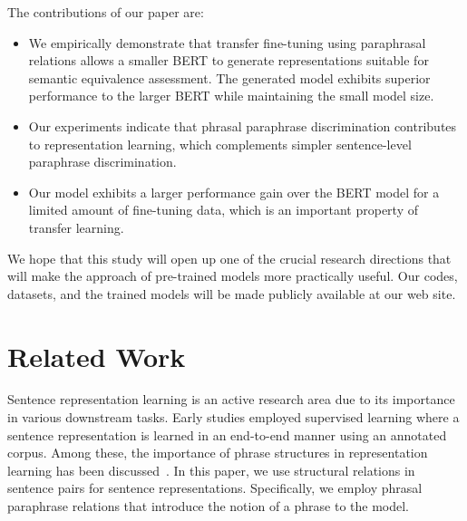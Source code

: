 \documentclass[11pt,a4paper]{article}
\begin{document}
 
The contributions of our paper are:
{
\setlength{\leftmargini}{15pt}
\begin{itemize}
\setlength{\itemsep}{0pt}
\item We empirically demonstrate that transfer fine-tuning using paraphrasal relations allows a smaller BERT to generate representations suitable for semantic equivalence assessment. The generated model exhibits superior performance to the larger BERT while maintaining the small model size. 
\item Our experiments indicate that phrasal paraphrase discrimination contributes to representation learning, which complements simpler sentence-level paraphrase discrimination. 
\item Our model exhibits a larger performance gain over the BERT model for a limited amount of fine-tuning data, which is an important property of transfer learning. 
\end{itemize}
}
\noindent
We hope that this study will open up one of the crucial research directions that will make the approach of pre-trained models more practically useful.
Our codes, datasets, and the trained models will be made publicly available at our web site. 

  
\section{Related Work}
Sentence representation learning is an active research area due to its importance in various downstream tasks. 
Early studies employed supervised learning where a sentence representation is learned in an end-to-end manner using an annotated corpus. 
Among these, the importance of phrase structures in representation learning has been discussed~\cite{tai-socher-manning:2015:ACL-IJCNLP,D18-1408}. 
In this paper, we use structural relations in sentence pairs for sentence representations. 
Specifically, we employ phrasal paraphrase relations that introduce the notion of a phrase to the model.
\end{document}
